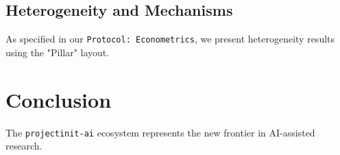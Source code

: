 \documentclass[12pt, letterpaper]{article}
\begin{document}
\subsection{Heterogeneity and Mechanisms}
As specified in our \texttt{Protocol: Econometrics}, we present heterogeneity results using the "Pillar" layout.

\section{Conclusion}
The \texttt{projectinit-ai} ecosystem represents the new frontier in AI-assisted research.
\end{document}
